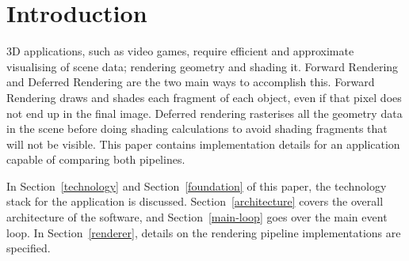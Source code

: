 \section{Introduction}
3D applications, such as video games, require efficient and approximate visualising of scene data; rendering geometry and shading it.
Forward Rendering and Deferred Rendering are the two main ways to accomplish this.
Forward Rendering draws and shades each fragment of each object, even if that pixel does not end up in the final image.
Deferred rendering rasterises all the geometry data in the scene before doing shading calculations to avoid shading fragments that will not be visible.
This paper contains implementation details for an application capable of comparing both pipelines.

In Section~\ref{technology} and Section~\ref{foundation} of this paper, the technology stack for the application is discussed.
Section~\ref{architecture} covers the overall architecture of the software, and Section~\ref{main-loop} goes over the main event loop.
In Section~\ref{renderer}, details on the rendering pipeline implementations are specified.

